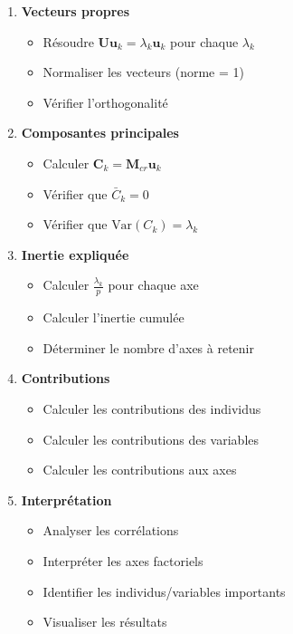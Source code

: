 \documentclass[11pt,a4paper]{article}
\newcommand{\Var}{\text{Var}}
\begin{document}
\begin{enumerate}
    \item[$\square$] \textbf{Vecteurs propres}
    \begin{itemize}
        \item Résoudre $\mathbf{U}\mathbf{u}_k = \lambda_k\mathbf{u}_k$ pour chaque $\lambda_k$
        \item Normaliser les vecteurs (norme = 1)
        \item Vérifier l'orthogonalité
    \end{itemize}
    
    \item[$\square$] \textbf{Composantes principales}
    \begin{itemize}
        \item Calculer $\mathbf{C}_k = \mathbf{M}_{cr}\mathbf{u}_k$
        \item Vérifier que $\bar{C}_k = 0$
        \item Vérifier que $\Var(C_k) = \lambda_k$
    \end{itemize}
    
    \item[$\square$] \textbf{Inertie expliquée}
    \begin{itemize}
        \item Calculer $\frac{\lambda_k}{p}$ pour chaque axe
        \item Calculer l'inertie cumulée
        \item Déterminer le nombre d'axes à retenir
    \end{itemize}
    
    \item[$\square$] \textbf{Contributions}
    \begin{itemize}
        \item Calculer les contributions des individus
        \item Calculer les contributions des variables
        \item Calculer les contributions aux axes
    \end{itemize}
    
    \item[$\square$] \textbf{Interprétation}
    \begin{itemize}
        \item Analyser les corrélations
        \item Interpréter les axes factoriels
        \item Identifier les individus/variables importants
        \item Visualiser les résultats
    \end{itemize}
\end{enumerate}
\end{document}
